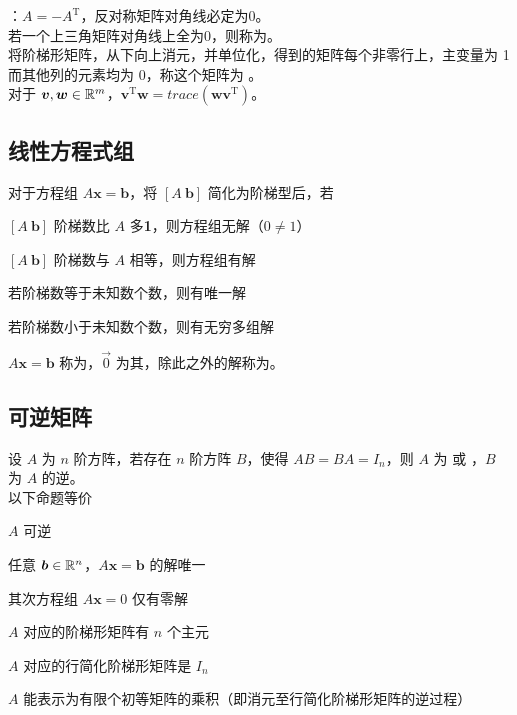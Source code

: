 \documentclass[./main.tex]{subfiles}
\begin{document}
：$A=-A^{\mathrm{T}}$，反对称矩阵对角线必定为0。\\

若一个上三角矩阵对角线上全为0，则称为。\\

将阶梯形矩阵，从下向上消元，并单位化，得到的矩阵每个非零行上，主变量为 1 而其他列的元素均为 0，称这个矩阵为 。\\

对于 $\bm{v},\bm{w}\in\mathbb{R}^{m}$，$\bm{v}^{\mathrm{T}}\bm{w} = trace(\bm{w}\bm{v}^{\mathrm{T}})$。

\subsection{线性方程式组}

对于方程组 $A\bm{x}=\bm{b}$，将 $[A\ \bm{b}]$ 简化为阶梯型后，若

\begin{enumerate*}
    \item $[A\ \bm{b}]$ 阶梯数比 $A$ 多\textbf{1}，则方程组无解（$0\neq 1$）
    \item $[A\ \bm{b}]$ 阶梯数与 $A$ 相等，则方程组有解
    \begin{enumerate*}
        \item 若阶梯数等于未知数个数，则有唯一解
        \item 若阶梯数小于未知数个数，则有无穷多组解
    \end{enumerate*}
\end{enumerate*}

$A\bm{x}=\bm{b}$ 称为，$\vec{0}$ 为其，除此之外的解称为。

\subsection{可逆矩阵}

设 $A$ 为 $n$ 阶方阵，若存在 $n$ 阶方阵 $B$，使得 $AB=BA=I_n$，则 $A$ 为  或 ，$B$ 为 $A$ 的逆。\\

以下命题等价
\begin{enumerate*}
    \item $A$ 可逆
    \item 任意 $\bm{b}\in\mathbb{R}^{n}$，$A\bm{x}=\bm{b}$ 的解唯一
    \item 其次方程组 $A\bm{x}=0$ 仅有零解
    \item $A$ 对应的阶梯形矩阵有 $n$ 个主元
    \item $A$ 对应的行简化阶梯形矩阵是 $I_n$
    \item $A$ 能表示为有限个初等矩阵的乘积（即消元至行简化阶梯形矩阵的逆过程）
\end{enumerate*}
\end{document}
